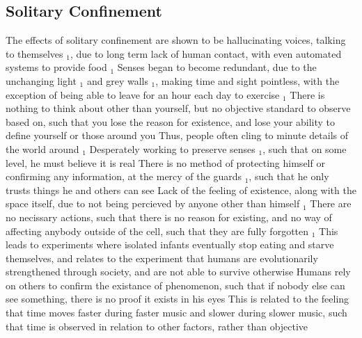 \documentclass[11 pt, twoside]{article}
\newenvironment{outline*}
{
	\begin{outline}[enumerate]
	}
	{\end{outline}
}
\newcommand{\foota}[1]{\hyperlink{#1}{$_#1$}}
\begin{document}
\subsection{Solitary Confinement}
\begin{outline*}
\1 The effects of solitary confinement are shown to be hallucinating voices, talking to themselves \foota{1}, due to long term lack of human contact, with even automated systems to provide food \foota{1}
\2 Senses began to become redundant, due to the unchanging light \foota{1} and grey walls \foota{1}, making time and sight pointless, with the exception of being able to leave for an hour each day to exercise \foota{1}
\3 There is nothing to think about other than yourself, but no objective standard to observe based on, such that you lose the reason for existence, and lose your ability to define yourself or those around you
\3 Thus, people often cling to minute details of the world around \foota{1}
\3 Desperately working to preserve senses \foota{1}, such that on some level, he must believe it is real
\2 There is no method of protecting himself or confirming any information, at the mercy of the guards \foota{1}, such that he only trusts things he and others can see
\2 Lack of the feeling of existence, along with the space itself, due to not being percieved by anyone other than himself \foota{1}
\3 There are no necissary actions, such that there is no reason for existing, and no way of affecting anybody outside of the cell, such that they are fully forgotten \foota{1}
\4 This leads to experiments where isolated infants eventually stop eating and starve themselves, and relates to the experiment that humans are evolutionarily strengthened through society, and are not able to survive otherwise
\3 Humans rely on others to confirm the existance of phenomenon, such that if nobody else can see something, there is no proof it exists in his eyes
\1 This is related to the feeling that time moves faster during faster music and slower during slower music, such that time is observed in relation to other factors, rather than objective
\end{outline*}
\end{document}
